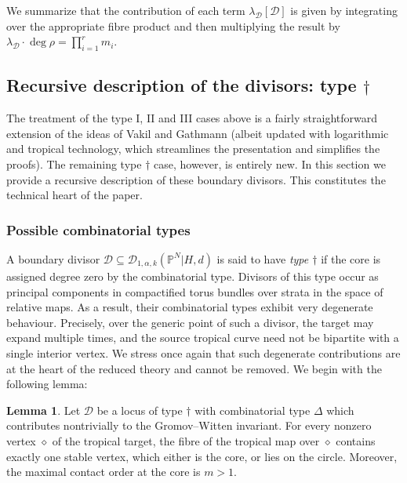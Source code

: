 \documentclass[11pt]{amsart}
\newcommand{\PP}{\mathbb P}
\newcommand{\Dcal}{\mathcal{D}}
\theoremstyle{definition}
\newtheorem{lemma}[thm]{Lemma}
\theoremstyle{definition}
\begin{document}
We summarize that the contribution of each term $\lambda_\Dcal [\Dcal]$ is given by integrating over the appropriate fibre product and then multiplying the result by $\lambda_\Dcal \cdot \deg\rho = \prod_{i=1}^r m_i$.

\subsection{Recursive description of the divisors: type $\dag$}\label{subsection C0 splitting} The treatment of the type I, II and III cases above is a fairly straightforward extension of the ideas of Vakil and Gathmann (albeit updated with logarithmic and tropical technology, which streamlines the presentation and simplifies the proofs). The remaining type $\dag$ case, however, is entirely new. In this section we provide a recursive description of these boundary divisors. This constitutes the technical heart of the paper.

\subsubsection{Possible combinatorial types} A boundary divisor $\Dcal \subseteq \Dcal_{1,\alpha,k}(\PP^N|H,d)$ is said to have \textit{type $\dag$} if the core is assigned degree zero by the combinatorial type. Divisors of this type occur as principal components in compactified torus bundles over strata in the space of relative maps. As a result, their combinatorial types exhibit very degenerate behaviour. Precisely, over the generic point of such a divisor, the target may expand multiple times, and the source tropical curve need not be bipartite with a single interior vertex. We stress once again that such degenerate contributions are at the heart of the reduced theory and cannot be removed.  We begin with the following lemma:
\begin{lemma} \label{lemma type C0 combinatorial types}
Let $\Dcal$ be a locus of type $\dag$ with combinatorial type $\Delta$ which contributes nontrivially to the Gromov--Witten invariant. For every nonzero vertex $\diamond$ of the tropical target, the fibre of the tropical map over $\diamond$ contains exactly one stable vertex, which either is the core, or lies on the circle. Moreover, the maximal contact order at the core is $m>1$.
\end{lemma}
\end{document}
